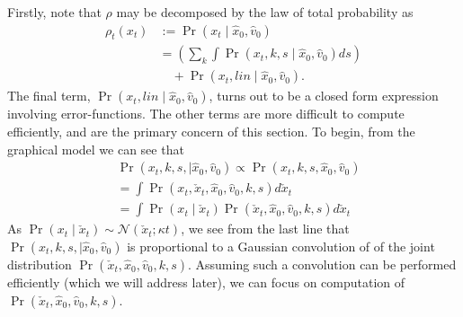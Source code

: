 \documentclass[conference]{IEEEtran}
\begin{document}
Firstly, note that $\rho$ may be decomposed by the law of total probability as
\begin{align*}
	\rho_t(x_t ) &:= \Pr( x_t \mid \hat{x}_0, \hat{v}_0 ) \\
	&= \left( \sum_{k} \int \Pr( x_t, k , s  \mid \hat{x}_0, \hat{v}_0 ) ds \right) \\
	&\quad + \Pr( x_t, lin \mid \hat{x}_0, \hat{v}_0 ).
\end{align*}
The final term, $\Pr( x_t, lin  \mid \hat{x}_0, \hat{v}_0)$, turns out to be a closed form expression involving error-functions.
The other terms are more difficult to compute efficiently, and are the primary concern of this section.
To begin, from the graphical model we can see that
\begin{align*}
	&\Pr( x_t, k,s,\mid \hat{x}_0, \hat{v}_0) \propto \Pr( x_t, k,s,\hat{x}_0, \hat{v}_0) \\
	&= \int \Pr( x_t, \check{x}_t , \hat{x}_0, \hat{v}_0, k,s) d\check{x}_t \\
	&= \int \Pr( x_t \mid \check{x}_t ) \Pr(\check{x}_t , \hat{x}_0, \hat{v}_0, k,s) d\check{x}_t
\end{align*}
As $\Pr( x_t \mid \check{x}_t) \sim \mathcal{N}( \check{x}_t ; \kappa t)$, we see from the last line that $\Pr( x_t, k,s,\mid \hat{x}_0, \hat{v}_0)$ is proportional to a Gaussian convolution of
of the joint distribution $\Pr( \check{x}_t , \hat{x}_0, \hat{v}_0, k,s)$.
Assuming such a convolution can be performed efficiently (which we will address later), we can focus on computation of $\Pr( \check{x}_t , \hat{x}_0, \hat{v}_0, k,s)$.
\end{document}
